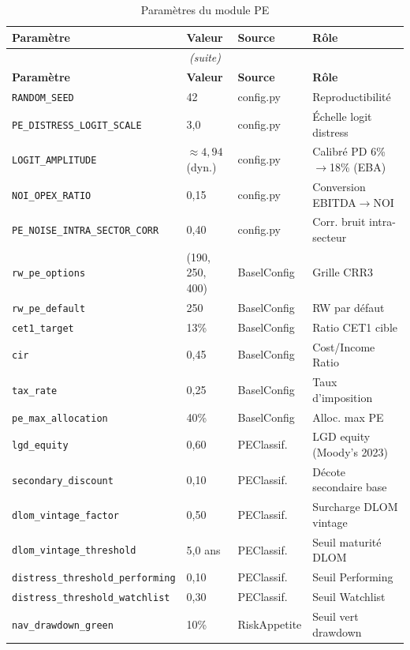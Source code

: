 \documentclass[12pt,a4paper]{article}
\begin{document}
\begin{longtable}{llll}
\caption{Param\`{e}tres du module PE} \label{tab:params} \\
\toprule
\textbf{Param\`{e}tre} & \textbf{Valeur} & \textbf{Source} & \textbf{R\^{o}le} \\
\midrule
\endfirsthead
\multicolumn{4}{c}{\textit{(suite)}} \\
\toprule
\textbf{Param\`{e}tre} & \textbf{Valeur} & \textbf{Source} & \textbf{R\^{o}le} \\
\midrule
\endhead
\texttt{RANDOM\_SEED} & 42 & config.py & Reproductibilit\'{e} \\
\texttt{PE\_DISTRESS\_LOGIT\_SCALE} & 3{,}0 & config.py & \'{E}chelle logit distress \\
\texttt{LOGIT\_AMPLITUDE} & $\approx 4{,}94$ (dyn.) & config.py & Calibr\'{e} PD 6\%$\rightarrow$18\% (EBA) \\
\texttt{NOI\_OPEX\_RATIO} & 0{,}15 & config.py & Conversion EBITDA$\rightarrow$NOI \\
\texttt{PE\_NOISE\_INTRA\_SECTOR\_CORR} & 0{,}40 & config.py & Corr. bruit intra-secteur \\
\texttt{rw\_pe\_options} & (190, 250, 400) & BaselConfig & Grille CRR3 \\
\texttt{rw\_pe\_default} & 250 & BaselConfig & RW par d\'{e}faut \\
\texttt{cet1\_target} & 13\% & BaselConfig & Ratio CET1 cible \\
\texttt{cir} & 0{,}45 & BaselConfig & Cost/Income Ratio \\
\texttt{tax\_rate} & 0{,}25 & BaselConfig & Taux d'imposition \\
\texttt{pe\_max\_allocation} & 40\% & BaselConfig & Alloc. max PE \\
\texttt{lgd\_equity} & 0{,}60 & PEClassif. & LGD equity (Moody's 2023) \\
\texttt{secondary\_discount} & 0{,}10 & PEClassif. & D\'{e}cote secondaire base \\
\texttt{dlom\_vintage\_factor} & 0{,}50 & PEClassif. & Surcharge DLOM vintage \\
\texttt{dlom\_vintage\_threshold} & 5{,}0 ans & PEClassif. & Seuil maturit\'{e} DLOM \\
\texttt{distress\_threshold\_performing} & 0{,}10 & PEClassif. & Seuil Performing \\
\texttt{distress\_threshold\_watchlist} & 0{,}30 & PEClassif. & Seuil Watchlist \\
\texttt{nav\_drawdown\_green} & 10\% & RiskAppetite & Seuil vert drawdown \\

\end{longtable}
\end{document}
